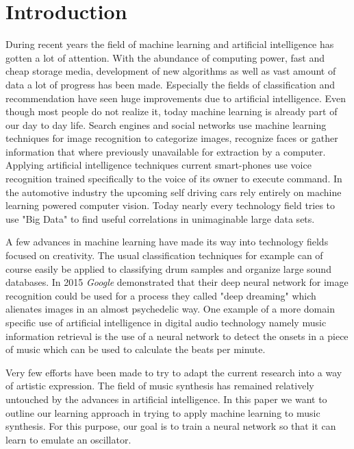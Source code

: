 \documentclass[conference]{IEEEtran}
\begin{document}
\section{Introduction}
During recent years the field of machine learning and artificial intelligence has gotten a lot of attention.
With the abundance of computing power, fast and cheap storage media, development of new algorithms as well as vast amount of data a lot of progress has been made.
Especially the fields of classification and recommendation have seen huge improvements due to artificial intelligence.
Even though most people do not realize it, today machine learning is already part of our day to day life.
Search engines and social networks use machine learning techniques for image recognition to categorize images, recognize faces or gather information that where previously unavailable for extraction by a computer.
Applying artificial intelligence techniques current smart-phones use voice recognition trained specifically to the voice of its owner to execute command.
In the automotive industry the upcoming self driving cars rely entirely on machine learning powered computer vision.
Today nearly every technology field tries to use "Big Data" to find useful correlations in unimaginable large data sets.

A few advances in machine learning have made its way into technology fields focused on creativity.
The usual classification techniques for example can of course easily be applied to classifying drum samples \cite{Herrera:DrumClassif} and organize large sound databases.
In 2015 \textit{Google} demonstrated that their deep neural network for image recognition \cite{GoogleDeepDream} could be used for a process they called "deep dreaming" which alienates images in an almost psychedelic way.
One example of a more domain specific use of artificial intelligence in digital audio technology namely music information retrieval is the use of a neural network to detect the onsets in a piece of music \cite{EybenOnSet} which can be used to calculate the beats per minute.


Very few efforts have been made to try to adapt the current research into a way of artistic expression.
The field of music synthesis has remained relatively untouched by the advances in artificial intelligence.
In this paper we want to outline our learning approach in trying to apply machine learning to music synthesis.
For this purpose, our goal is to train a neural network so that it can learn to emulate an oscillator.
\end{document}

